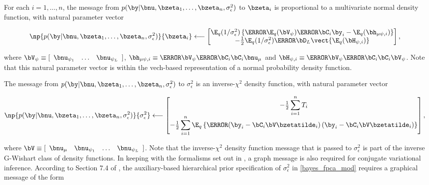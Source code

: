 \documentclass[ba]{imsart}
\numberwithin{equation}{section}
\theoremstyle{plain}
\def\sigsqeps{\sigma^2_{\epsilon}}
\def\numu{\bnu_\mu}
\def\Vpsi{\bV_\psi}
\newcommand\nupsi[1]{\bnu_{\psi_{#1}}}
\newcommand\hmupsi[1]{\bh_{\mu \psi, i}}
\newcommand\Hpsi[1]{\bH_{\psi, i}}
\begin{document}
For each $i = 1, \dots, n$, the message from $p (\by | \bnu, \bzeta_1, \dots, \bzeta_n, \sigsqeps)$ to $\bzeta_i$
is proportional to a multivariate normal density function, with natural parameter vector

\begin{equation}
	\np{p (\by | \bnu, \bzeta_1, \dots, \bzeta_n, \sigsqeps)}{\bzeta_i}
		\longleftarrow
			\begin{bmatrix}
				\E_q (1/\sigsqeps) \left\{
					\T{\E_q (\Vpsi)} \T{\bC_i} \by_i - \E_q (\hmupsi{i})
				\right\} \\
				-\frac12 \E_q (1/\sigsqeps) \T{\bD_L} \vect \{ \E_q (\Hpsi{i}) \}
			\end{bmatrix},
\label{np_lik_zeta}
\end{equation}

\noindent where $ \Vpsi \equiv [\begin{array}{ccc} \nupsi{1} & \dots & \nupsi{L} \end{array}]$,
$\hmupsi{i} \equiv \T{\Vpsi} \T{\bC_i} \bC_i \numu$ and $\Hpsi{i} \equiv \T{\Vpsi} \T{\bC_i} \bC_i \Vpsi$.
Note that this natural parameter vector is within the vech-based representation of a normal probability density function.

The message from $p (\by | \bnu, \bzeta_1, \dots, \bzeta_n, \sigsqeps)$ to $\sigsqeps$
is an inverse-$\chi^2$ density function, with natural parameter vector

\begin{equation}
	\np{p (\by | \bnu, \bzeta_1, \dots, \bzeta_n, \sigsqeps)}{\sigsqeps}
		\longleftarrow
			\begin{bmatrix}
				-\frac12 \displaystyle\sum_{i=1}^n T_i \\
				-\frac12 \displaystyle\sum_{i=1}^n \E_q \left\{ \T{\left(
					\by_i - \bC_i \bV \bzetatilde_i
				\right)} \left(
					\by_i - \bC_i \bV \bzetatilde_i
				\right) \right\}
			\end{bmatrix},
\label{np_lik_sigsqeps}
\end{equation}

\noindent where $\bV \equiv [\begin{array}{cccc} \numu & \nupsi{1} & \dots & \nupsi{L} \end{array}]$.
Note that the inverse-$\chi^2$ density function message that is passed
to $\sigsqeps$ is part of the inverse G-Wishart class of density functions. In keeping
with the formalisms set out in \citet{maestrini20},
a graph message is also required for conjugate variational inference.
According to Section 7.4 of \citet{maestrini20},
the auxiliary-based hierarchical prior specification of $\sigsqeps$ in \eqref{bayes_fpca_mod} requires a
graphical message of the form
\end{document}
